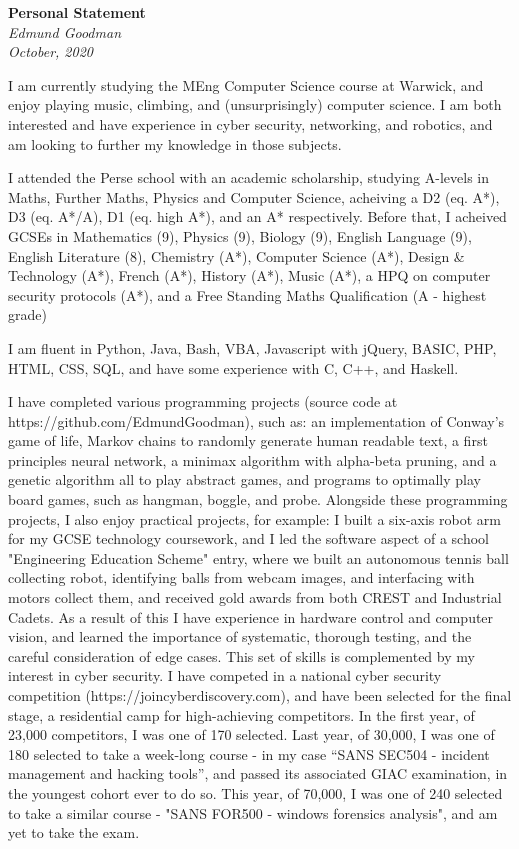 \documentclass{article}
\begin{document}
\begin{center}
    \Huge\textbf{Personal Statement}\\
    \huge\textit{Edmund Goodman}\\
    \huge\textit{October, 2020}
\end{center}

I am currently studying the MEng Computer Science course at Warwick, and enjoy playing music, climbing, and (unsurprisingly) computer science. I am both interested and have experience in cyber security, networking, and robotics, and am looking to further my knowledge in those subjects.

I attended the Perse school with an academic scholarship, studying A-levels in Maths, Further Maths, Physics and Computer Science, acheiving a D2 (eq. A*), D3 (eq. A*/A), D1 (eq. high A*), and an A* respectively. Before that, I acheived GCSEs in Mathematics (9), Physics (9), Biology (9), English Language (9), English Literature (8), Chemistry (A*), Computer Science (A*), Design \& Technology (A*), French (A*), History (A*), Music (A*), a HPQ on computer security protocols (A*), and a Free Standing Maths Qualification (A - highest grade)

I am fluent in Python, Java, Bash, VBA, Javascript with jQuery, BASIC, PHP, HTML, CSS, SQL, and have some experience with C, C++, and Haskell.

I have completed various programming projects (source code at https://github.com/EdmundGoodman), such as:
an implementation of Conway’s game of life, Markov chains to randomly generate human readable text, a first principles neural network, a minimax algorithm with alpha-beta pruning, and a genetic algorithm all to play abstract games, and programs to optimally play board games, such as hangman, boggle, and probe. Alongside these programming projects, I also enjoy practical projects, for example: I built a six-axis robot arm for my GCSE technology coursework, and I led the software aspect of a school "Engineering Education Scheme" entry, where we built an autonomous tennis ball collecting robot, identifying balls from webcam images, and interfacing with motors collect them, and received gold awards from both CREST and Industrial Cadets. As a result of this I have experience in hardware control and computer vision, and learned the importance of systematic, thorough testing, and the careful consideration of edge cases. This set of skills is complemented by my interest in cyber security. I have competed in a national cyber security competition (https://joincyberdiscovery.com), and have been selected for the final stage, a residential camp for high-achieving competitors. In the first year, of 23,000 competitors, I was one of 170 selected. Last year, of 30,000, I was one of 180 selected to take a week-long course - in my case “SANS SEC504 - incident management and hacking tools”, and passed its associated GIAC examination, in the youngest cohort ever to do so. This year, of 70,000, I was one of 240 selected to take a similar course - "SANS FOR500 - windows forensics analysis", and am yet to take the exam.
\end{document}
